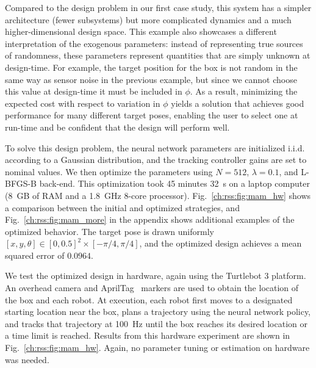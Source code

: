 
Compared to the design problem in our first case study, this system has a simpler architecture (fewer subsystems) but more complicated dynamics and a much higher-dimensional design space. This example also showcases a different interpretation of the exogenous parameters: instead of representing true sources of randomness, these parameters represent quantities that are simply unknown at design-time. For example, the target position for the box is not random in the same way as sensor noise in the previous example, but since we cannot choose this value at design-time it must be included in $\phi$. As a result, minimizing the expected cost with respect to variation in $\phi$ yields a solution that achieves good performance for many different target poses, enabling the user to select one at run-time and be confident that the design will perform well.

To solve this design problem, the neural network parameters are initialized i.i.d. according to a Gaussian distribution, and the tracking controller gains are set to nominal values. We then optimize the parameters using $N = 512$, $\lambda = 0.1$, and L-BFGS-B back-end. This optimization took 45 minutes \SI{32}{s} on a laptop computer (\SI{8}{GB} of RAM and a \SI{1.8}{GHz} 8-core processor). Fig.~\ref{ch:rss:fig:mam_hw} shows a comparison between the initial and optimized strategies, and Fig.~\ref{ch:rss:fig:mam_more} in the appendix shows additional examples of the optimized behavior. The target pose is drawn uniformly $[x, y, \theta] \in[0, 0.5]^2 \times [-\pi/4, \pi/4]$, and the optimized design achieves a mean squared error of $0.0964$.

We test the optimized design in hardware, again using the Turtlebot 3 platform. An overhead camera and AprilTag~\cite{olson2011tags} markers are used to obtain the location of the box and each robot. At execution, each robot first moves to a designated starting location near the box, plans a trajectory using the neural network policy, and tracks that trajectory at \SI{100}{Hz} until the box reaches its desired location or a time limit is reached. Results from this hardware experiment are shown in Fig.~\ref{ch:rss:fig:mam_hw}. Again, no parameter tuning or estimation on hardware was needed.

